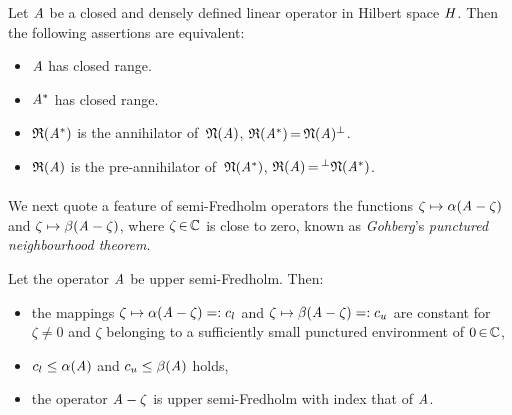 \documentclass[11pt,twoside]{article}
\begin{document}
\begin{theorem}\label{CLOSED_RANGE_THEOREM}
Let $\mathit{A}$ be a closed and densely defined linear operator
in Hilbert space $\mathit{H}$.
Then the following assertions are equivalent:

\begin{itemize}[leftmargin=12pt]
\item[1.]
$\mathit{A}$ has closed range.
\item[2.]
$\mathit{A}^*$ has closed range.
\item[3.]
$\mathfrak{R}(\mathit{A}^*)$ is the annihilator of $\,\mathfrak{N}(\mathit{A})$, {\ie}
$\mathfrak{R}(\mathit{A}^*) {\,=\,} \mathfrak{N}(\mathit{A}) ^{\bot} $.
\item[4.]
$\mathfrak{R}(\mathit{A}) $ is the pre-annihilator of $\,\mathfrak{N}(\mathit{A}^*)$, {\ie}
$\mathfrak{R}(\mathit{A}) {\,=\,} ^{\bot}\mathfrak{N}(\mathit{A}^*) $.
\end{itemize}
\end{theorem}


\paragraph*{}
We next quote a feature of semi-Fredholm operators {\wrt} the functions
$\zeta \mapsto \alpha(\mathit{A}-\zeta)$ and
$\zeta \mapsto \beta(\mathit{A}-\zeta)$,
where $\zeta {\,\in\,} {\mathbb{C}}$ is close to zero,
known as \textit{Gohberg}'s \textit{punctured neighbourhood theorem}.

\begin{theorem}\label{PUNCTURED_NEIGHBOURHOOD_THEOREM}
Let the operator $\mathit{A}$ be upper semi-Fredholm.
Then:

\begin{itemize}[leftmargin=12pt]
\item[1.]
the mappings $\zeta \mapsto \alpha(\mathit{A}-\zeta) =:c_l$ and
             $\zeta \mapsto \beta(\mathit{A}-\zeta) =: c_u$
are constant for $\zeta \neq 0$ and $\zeta$ belonging to
a sufficiently small punctured environment of $0 {\,\in\,} {\mathbb{C}}$,
\item[2.]
$c_l \leq \alpha(\mathit{A})$ and $c_u \leq \beta(\mathit{A})$ holds,
\item[3.]
the operator $\mathit{A} - \zeta$ is upper semi-Fredholm with index that of $\mathit{A}$.
\end{itemize}
\end{theorem}
\end{document}
